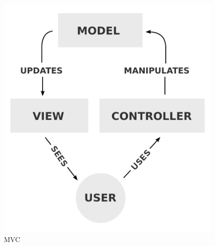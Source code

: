 \documentclass[a4paper]{article}
\theoremstyle{break}
\begin{document}
\begin{figure}[H]
	\centering
	\includegraphics[width=\textwidth]{../diagrams/misc/mvc.png}
	\caption{MVC}
\end{figure}
\end{document}
